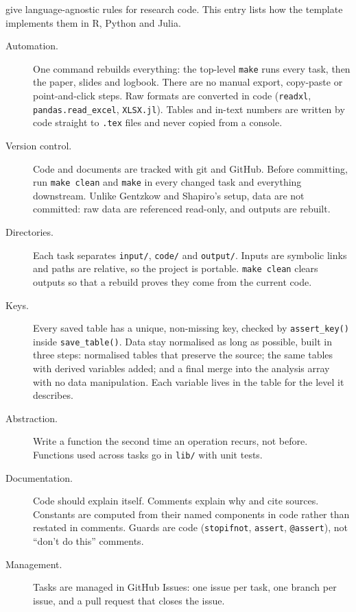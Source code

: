 \citet{GentzkowShapiro:2014} give language-agnostic rules for research code.
This entry lists how the template implements them in R, Python and Julia.

\begin{description}
	\item[Automation.]
	One command rebuilds everything: the top-level \texttt{make} runs every task, then the paper, slides and logbook.
	There are no manual export, copy-paste or point-and-click steps.
	Raw formats are converted in code (\texttt{readxl}, \texttt{pandas.read\_excel}, \texttt{XLSX.jl}).
	Tables and in-text numbers are written by code straight to \texttt{.tex} files and never copied from a console.

	\item[Version control.]
	Code and documents are tracked with git and GitHub.
	Before committing, run \texttt{make clean} and \texttt{make} in every changed task and everything downstream.
	Unlike Gentzkow and Shapiro's setup, data are not committed: raw data are referenced read-only, and outputs are rebuilt.

	\item[Directories.]
	Each task separates \texttt{input/}, \texttt{code/} and \texttt{output/}.
	Inputs are symbolic links and paths are relative, so the project is portable.
	\texttt{make clean} clears outputs so that a rebuild proves they come from the current code.

	\item[Keys.]
	Every saved table has a unique, non-missing key, checked by \texttt{assert\_key()} inside \texttt{save\_table()}.
	Data stay normalised as long as possible, built in three steps: normalised tables that preserve the source; the same tables with derived variables added; and a final merge into the analysis array with no data manipulation.
	Each variable lives in the table for the level it describes.

	\item[Abstraction.]
	Write a function the second time an operation recurs, not before.
	Functions used across tasks go in \texttt{lib/} with unit tests.

	\item[Documentation.]
	Code should explain itself.
	Comments explain why and cite sources.
	Constants are computed from their named components in code rather than restated in comments.
	Guards are code (\texttt{stopifnot}, \texttt{assert}, \texttt{@assert}), not ``don't do this'' comments.

	\item[Management.]
	Tasks are managed in GitHub Issues: one issue per task, one branch per issue, and a pull request that closes the issue.


\end{description}
